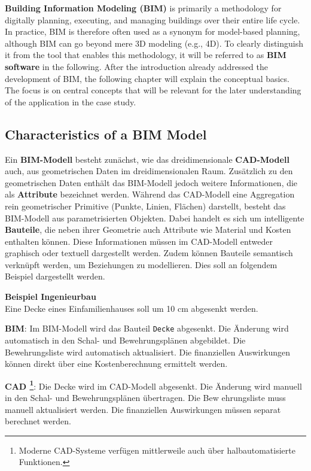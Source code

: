 \begin{English}
    \textbf{Building Information Modeling (BIM)} is primarily a methodology for digitally planning, executing, and managing buildings over their entire life cycle. In practice, BIM is therefore often used as a synonym for model-based planning, although BIM can go beyond mere 3D modeling (e.g., 4D). To clearly distinguish it from the tool that enables this methodology, it will be referred to as \textbf{BIM software} in the following. 
    After the introduction already addressed the development of BIM, the following chapter will explain the conceptual basics. The focus is on central concepts that will be relevant for the later understanding of the application in the case study.
\end{English}

\subsection{Characteristics of a BIM Model}
\begin{German}
    Ein \textbf{BIM-Modell} besteht zunächst, wie das dreidimensionale \textbf{CAD-Modell} auch, aus geometrischen Daten im dreidimensionalen Raum. Zusätzlich zu den geometrischen Daten enthält das BIM-Modell jedoch weitere Informationen, die als \textbf{Attribute} bezeichnet werden. Während das CAD-Modell eine Aggregation rein geometrischer Primitive (Punkte, Linien, Flächen) darstellt, besteht das BIM-Modell aus parametrisierten Objekten. Dabei handelt es sich um intelligente \textbf{Bauteile}, die neben ihrer Geometrie auch Attribute wie Material und Kosten enthalten können. Diese Informationen müssen im CAD-Modell entweder graphisch oder textuell dargestellt werden. Zudem können Bauteile semantisch verknüpft werden, um Beziehungen zu modellieren. Dies soll an folgendem Beispiel dargestellt werden. \cite{astourLehrbuchGrundlagenBIMArbeitsmethode2022} \\
    
    \begin{itshape}
    \textbf{Beispiel Ingenieurbau}\\
    Eine Decke eines Einfamilienhauses soll um 10 cm abgesenkt werden.

    \textbf{BIM}: Im BIM-Modell wird das Bauteil \texttt{Decke} abgesenkt. Die Änderung wird automatisch in den Schal- und Bewehrungsplänen abgebildet. Die Bewehrungsliste wird automatisch aktualisiert. Die finanziellen Auswirkungen können direkt über eine Kostenberechnung ermittelt werden.

    \textbf{CAD \footnote{Moderne CAD-Systeme verfügen mittlerweile auch über halbautomatisierte Funktionen.}}: Die Decke wird im CAD-Modell abgesenkt. Die Änderung wird manuell in den Schal- und Bewehrungsplänen übertragen. Die Bew
    ehrungsliste muss manuell aktualisiert werden. Die finanziellen Auswirkungen müssen separat berechnet werden.
    \end{itshape}
\end{German}

